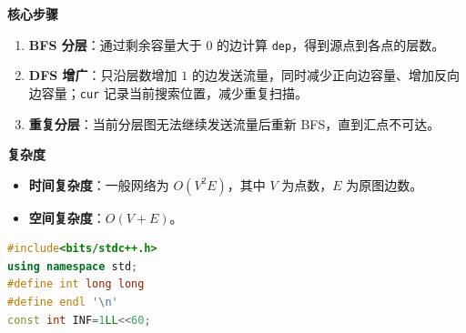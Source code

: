\documentclass[10pt,landscape,a4paper]{article}
\begin{document}
\begin{multicols*}{3}
\par\addvspace{0.7ex}\noindent\textbf{核心步骤}\par\nobreak
\begin{enumerate}[start=1]
\item \textbf{BFS 分层}：通过剩余容量大于 $0$ 的边计算 \texttt{d\allowbreak{}e\allowbreak{}p}，得到源点到各点的层数。
\item \textbf{DFS 增广}：只沿层数增加 $1$ 的边发送流量，同时减少正向边容量、增加反向边容量；\texttt{c\allowbreak{}u\allowbreak{}r} 记录当前搜索位置，减少重复扫描。
\item \textbf{重复分层}：当前分层图无法继续发送流量后重新 BFS，直到汇点不可达。
\end{enumerate}
\par\addvspace{0.7ex}\noindent\textbf{复杂度}\par\nobreak
\begin{itemize}
\item \textbf{时间复杂度}：一般网络为 $O(V^2E)$，其中 $V$ 为点数，$E$ 为原图边数。
\item \textbf{空间复杂度}：$O(V+E)$。
\end{itemize}
\par{}\par
\begin{lstlisting}[language=C++]
#include<bits/stdc++.h>
using namespace std;
#define int long long
#define endl '\n'
const int INF=1LL<<60;


\end{lstlisting}
\end{multicols*}
\end{document}
